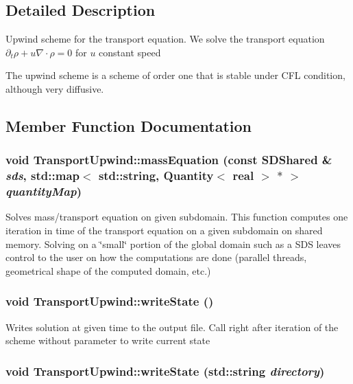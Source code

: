 \subsection{Detailed Description}
Upwind scheme for the transport equation. We solve the transport equation $\partial_t \rho + u \nabla \cdot \rho = 0$ for $u$ constant speed

The upwind scheme is a scheme of order one that is stable under CFL condition, although very diffusive. 

\subsection{Member Function Documentation}
\hypertarget{classTransportUpwind_a1a59087c829238f58f028a544269be54}{
\subsubsection[{massEquation}]{\setlength{\rightskip}{0pt plus 5cm}void TransportUpwind::massEquation (const {\bf SDShared} \& {\em sds}, \/  std::map$<$ std::string, {\bf Quantity}$<$ real $>$ $\ast$ $>$ {\em quantityMap})}}
\label{classTransportUpwind_a1a59087c829238f58f028a544269be54}


Solves mass/transport equation on given subdomain. This function computes one iteration in time of the transport equation on a given subdomain on shared memory. Solving on a \char`\"{}small\char`\"{} portion of the global domain such as a SDS leaves control to the user on how the computations are done (parallel threads, geometrical shape of the computed domain, etc.) \hypertarget{classTransportUpwind_aad7f9cd10acf49402a6a4fe039669a34}{
\subsubsection[{writeState}]{\setlength{\rightskip}{0pt plus 5cm}void TransportUpwind::writeState ()}}
\label{classTransportUpwind_aad7f9cd10acf49402a6a4fe039669a34}


Writes solution at given time to the output file. Call right after iteration of the scheme without parameter to write current state \hypertarget{classTransportUpwind_a6eb3dea8ecfa8441e56b0c0f8f787377}{
\subsubsection[{writeState}]{\setlength{\rightskip}{0pt plus 5cm}void TransportUpwind::writeState (std::string {\em directory})}}
\label{classTransportUpwind_a6eb3dea8ecfa8441e56b0c0f8f787377}


